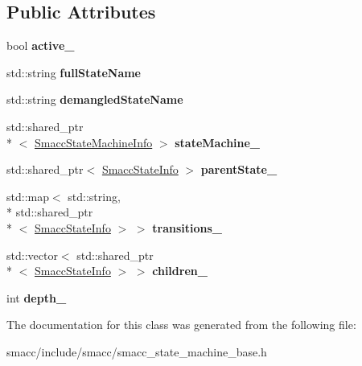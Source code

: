 \subsection*{Public Attributes}
\begin{DoxyCompactItemize}
\item 
\hypertarget{classsmacc_1_1SmaccStateInfo_a12b5db7f92c7d1bbef492b6f33d2680d}{bool {\bfseries active\-\_\-}}\label{classsmacc_1_1SmaccStateInfo_a12b5db7f92c7d1bbef492b6f33d2680d}

\item 
\hypertarget{classsmacc_1_1SmaccStateInfo_a3d9d81ebeda351fba21665bb7b9ff148}{std\-::string {\bfseries full\-State\-Name}}\label{classsmacc_1_1SmaccStateInfo_a3d9d81ebeda351fba21665bb7b9ff148}

\item 
\hypertarget{classsmacc_1_1SmaccStateInfo_ad36e29f3984e40d36664567f9703239a}{std\-::string {\bfseries demangled\-State\-Name}}\label{classsmacc_1_1SmaccStateInfo_ad36e29f3984e40d36664567f9703239a}

\item 
\hypertarget{classsmacc_1_1SmaccStateInfo_af9884b3fda41fbc87abf9908b8bd72e7}{std\-::shared\-\_\-ptr\\*
$<$ \hyperlink{classsmacc_1_1SmaccStateMachineInfo}{Smacc\-State\-Machine\-Info} $>$ {\bfseries state\-Machine\-\_\-}}\label{classsmacc_1_1SmaccStateInfo_af9884b3fda41fbc87abf9908b8bd72e7}

\item 
\hypertarget{classsmacc_1_1SmaccStateInfo_ae19f4efbeb2ca665b320df80766d9209}{std\-::shared\-\_\-ptr$<$ \hyperlink{classsmacc_1_1SmaccStateInfo}{Smacc\-State\-Info} $>$ {\bfseries parent\-State\-\_\-}}\label{classsmacc_1_1SmaccStateInfo_ae19f4efbeb2ca665b320df80766d9209}

\item 
\hypertarget{classsmacc_1_1SmaccStateInfo_ad9a57f1532506ff82a2885e854f6132f}{std\-::map$<$ std\-::string, \\*
std\-::shared\-\_\-ptr\\*
$<$ \hyperlink{classsmacc_1_1SmaccStateInfo}{Smacc\-State\-Info} $>$ $>$ {\bfseries transitions\-\_\-}}\label{classsmacc_1_1SmaccStateInfo_ad9a57f1532506ff82a2885e854f6132f}

\item 
\hypertarget{classsmacc_1_1SmaccStateInfo_a7773f1d9e865a839b0bfed087bbb93ba}{std\-::vector$<$ std\-::shared\-\_\-ptr\\*
$<$ \hyperlink{classsmacc_1_1SmaccStateInfo}{Smacc\-State\-Info} $>$ $>$ {\bfseries children\-\_\-}}\label{classsmacc_1_1SmaccStateInfo_a7773f1d9e865a839b0bfed087bbb93ba}

\item 
\hypertarget{classsmacc_1_1SmaccStateInfo_a3f44d5af069d0f37ed63b3101b330a65}{int {\bfseries depth\-\_\-}}\label{classsmacc_1_1SmaccStateInfo_a3f44d5af069d0f37ed63b3101b330a65}

\end{DoxyCompactItemize}


The documentation for this class was generated from the following file\-:\begin{DoxyCompactItemize}
\item 
smacc/include/smacc/smacc\-\_\-state\-\_\-machine\-\_\-base.\-h\end{DoxyCompactItemize}
